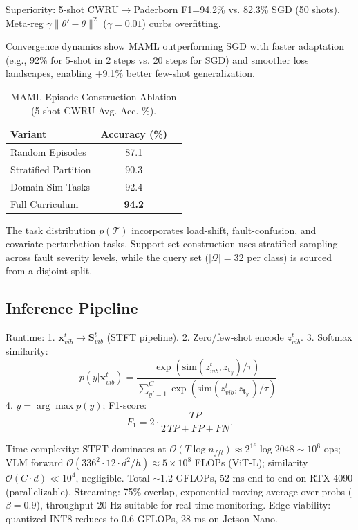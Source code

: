 Superiority: 5-shot CWRU$\to$Paderborn F1=94.2\% vs. 82.3\% SGD (50 shots). Meta-reg $\gamma \|\theta'-\theta\|^2$ ($\gamma=0.01$) curbs overfitting.

Convergence dynamics show MAML outperforming SGD with faster adaptation (e.g., 92\% for 5-shot in 2 steps vs. 20 steps for SGD) and smoother loss landscapes, enabling +9.1\% better few-shot generalization.

\begin{table}[t]
\centering
\caption{MAML Episode Construction Ablation (5-shot CWRU Avg. Acc. \%).}
\label{tab:maml_ablation}
\begin{tabular}{@{}lcc@{}}
\toprule
Variant & Accuracy (\%) \\
\midrule
Random Episodes & 87.1 \\
Stratified Partition & 90.3 \\
Domain-Sim Tasks & 92.4 \\
Full Curriculum & \textbf{94.2} \\
\bottomrule
\end{tabular}
\end{table}

The task distribution $p(\mathcal{T})$ incorporates load-shift, fault-confusion, and covariate perturbation tasks. Support set construction uses stratified sampling across fault severity levels, while the query set ($|\mathcal{Q}|=32$ per class) is sourced from a disjoint split.

\subsection{Inference Pipeline}
\label{subsec:inference_pipeline}

Runtime:
1. $\mathbf{x}_{vib}^t \to \mathbf{S}_{vib}^t$ (STFT pipeline).
2. Zero/few-shot encode $z_{vib}^t$.
3. Softmax similarity:
\begin{equation}
p(y|\mathbf{x}_{vib}^t) = \frac{\exp(\mathrm{sim}(z_{vib}^t, z_{\mathbf{t}_y})/\tau)}{\sum_{y'=1}^C \exp(\mathrm{sim}(z_{vib}^t, z_{\mathbf{t}_{y'}})/\tau)}.
\label{eq:f9}
\end{equation}
4. $\hat{y} = \arg\max p(y)$; F1-score:
\begin{equation}
F_1 = 2 \cdot \frac{TP}{2 \, TP + FP + FN}.
\label{eq:f10}
\end{equation}

Time complexity: STFT dominates at $\mathcal{O}(T \log n_{fft}) \approx 2^{16} \log 2048 \sim 10^6$ ops; VLM forward $\mathcal{O}(336^2 \cdot 12 \cdot d^2 / h) \approx 5 \times 10^8$ FLOPs (ViT-L); similarity $\mathcal{O}(C \cdot d) \ll 10^4$, negligible. Total $\sim 1.2$ GFLOPs, 52 ms end-to-end on RTX 4090 (parallelizable). Streaming: 75\% overlap, exponential moving average over probs ( $\beta=0.9$), throughput 20 Hz suitable for real-time monitoring. Edge viability: quantized INT8 reduces to 0.6 GFLOPs, 28 ms on Jetson Nano.

